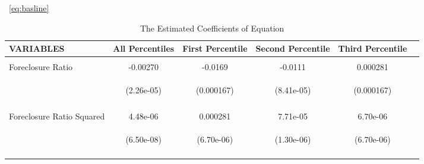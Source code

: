 \documentclass[12pt,oneside]{amsbook}
\begin{document}
\begin{table}\label{table:basic_results}
\caption{The Estimated Coefficients of Equation}~\ref{eq:basline}

\begin{tabular}{lccccc} \hline

VARIABLES & All Percentiles & First Percentile & Second Percentile & Third Percentile \\ \hline
 &    &  &  &  \\
Foreclosure Ratio                 &-0.00270 & -0.0169 & -0.0111 & 0.000281 \\
& \begin{footnotesize}(2.26e-05)\end{footnotesize} & \begin{footnotesize}(0.000167)\end{footnotesize} & \begin{footnotesize}(8.41e-05)\end{footnotesize} & \begin{footnotesize}(0.000167)\end{footnotesize} &  \\
\vspace{4pt}& \begin{footnotesize}\end{footnotesize} & \begin{footnotesize}\end{footnotesize} & \begin{footnotesize}\end{footnotesize} & \begin{footnotesize}\end{footnotesize} & \begin{footnotesize}\end{footnotesize}\\
Foreclosure Ratio Squared         & 4.48e-06 & 0.000281 & 7.71e-05 & 6.70e-06 \\
&\begin{footnotesize}(6.50e-08)\end{footnotesize} & 
\begin{footnotesize}(6.70e-06)\end{footnotesize} & \begin{footnotesize}(1.30e-06)\end{footnotesize} & \begin{footnotesize}(6.70e-06)\end{footnotesize} \\ \vspace{4pt}& \begin{footnotesize}\end{footnotesize} & \begin{footnotesize}\end{footnotesize} & \begin{footnotesize}\end{footnotesize} & \begin{footnotesize}\end{footnotesize} & \begin{footnotesize}\end{footnotesize}\\

\end{tabular}
\end{table}
\end{document}
